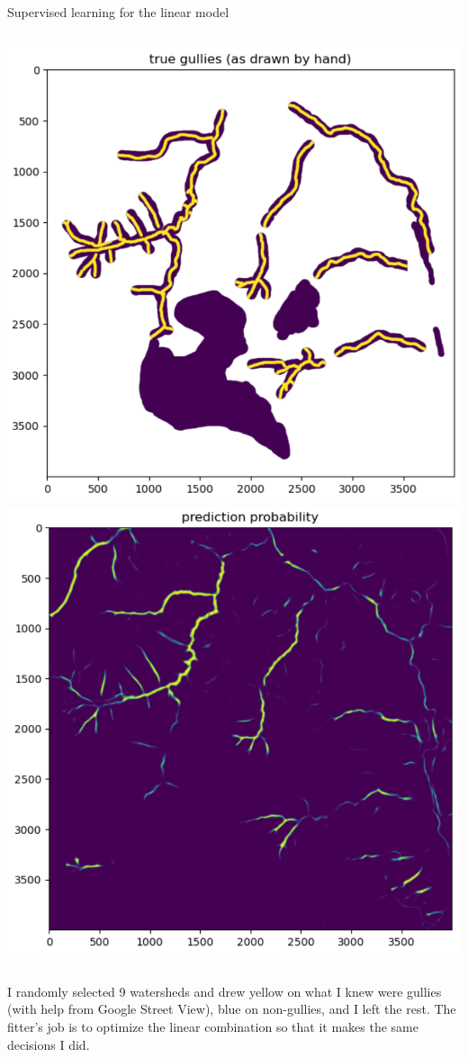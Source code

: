 \documentclass[aspectratio=169]{beamer}
\begin{document}
\begin{frame}{Supervised learning for the linear model}
\vspace{0.15 cm}
\begin{columns}
\includegraphics[width=\linewidth]{img/fit-supervised-learning-1.png}
\includegraphics[width=\linewidth]{img/fit-supervised-learning-2.png}
\end{columns}

\vspace{0.1 cm}
I randomly selected 9 watersheds and drew yellow on what I knew were gullies (with help from Google Street View), blue on non-gullies, and I left the rest. The fitter's job is to optimize the linear combination so that it makes the same decisions I did.
\end{frame}
\end{document}
